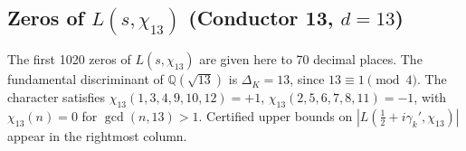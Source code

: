 \documentclass[12pt,reqno]{amsart}
\theoremstyle{remark}
\newcommand{\Q}{\mathbb{Q}}
\begin{document}
\subsection{Zeros of \texorpdfstring{$L(s,\chi_{13})$}{L(s,chi13)} (Conductor 13, \texorpdfstring{$d = 13$}{d=13})}
\label{subsec:chi13}

The first 1020 zeros of $L(s,\chi_{13})$ are given here to 70 decimal places.  The fundamental discriminant of $\Q(\sqrt{13})$ is $\Delta_K = 13$, since $13 \equiv 1 \pmod{4}$.  The character satisfies $\chi_{13}(1,3,4,9,10,12) = +1$, $\chi_{13}(2,5,6,7,8,11) = -1$, with $\chi_{13}(n) = 0$ for $\gcd(n,13) > 1$.  Certified upper bounds on $|L(\tfrac{1}{2}+i\gamma_k',\chi_{13})|$ appear in the rightmost column.

\renewcommand{\arraystretch}{1.1}
\setlength{\LTleft}{\fill}
\setlength{\LTright}{\fill}
\footnotesize
\end{document}

